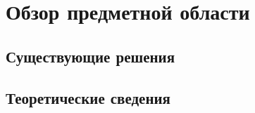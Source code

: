 \section{Обзор предметной области}
\label{}

\subsection{Существующие решения}
\label{}

\subsection{Теоретические сведения}
\label{}